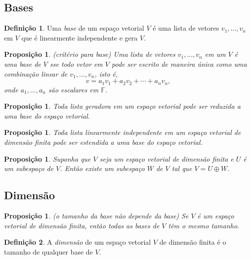 \documentclass[12pt]{article}
\theoremstyle{plain}
\newtheorem{prop}[thm]{Proposição}
\theoremstyle{definition}
\newtheorem{defn}{Definição}[section]
\theoremstyle{remark}
\begin{document}
\subsection{Bases}
\begin{defn}
    Uma \emph{base} de um espaço vetorial \(V\) é uma lista de vetores \(v_1, \ldots, v_n\) em \(V\) que é linearmente independente e gera \(V\).
\end{defn}

\begin{prop} (critério para base)
    Uma lista de vetores \(v_1, \ldots, v_n\) em um \(V\) é uma base de \(V\) sse todo vetor em \(V\) pode ser escrito de maneira única como uma combinação linear de \(v_1, \ldots, v_n\), isto é,
    \begin{equation}
        v = a_1 v_1 + a_2 v_2 + \cdots + a_n v_n,
    \end{equation}
    \noindent onde \(a_1, \ldots, a_n\) são escalares em \(\mathbb{F}\).
\end{prop}

\begin{prop}
    Toda lista geradora em um espaço vetorial pode ser reduzida a uma base do espaço vetorial.
\end{prop}

\begin{prop}
    Toda lista linearmente independente em um espaço vetorial de dimensão finita pode ser estendida a uma base do espaço vetorial.
\end{prop}

\begin{prop}
    Suponha que \(V\) seja um espaço vetorial de dimensão finita e \(U\) é um subespaço de \(V\). Então existe um subespaço \(W\) de \(V\) tal que \(V = U \oplus W\).
\end{prop}

\subsection{Dimensão}
\begin{prop} (o tamanho da base não depende da base)
    Se \(V\) é um espaço vetorial de dimensão finita, então todas as bases de \(V\) têm o mesmo tamanho.
\end{prop}

\begin{defn}
    A \emph{dimensão} de um espaço vetorial \(V\) de dimensão finita é o tamanho de qualquer base de \(V\).
\end{defn}
\end{document}
